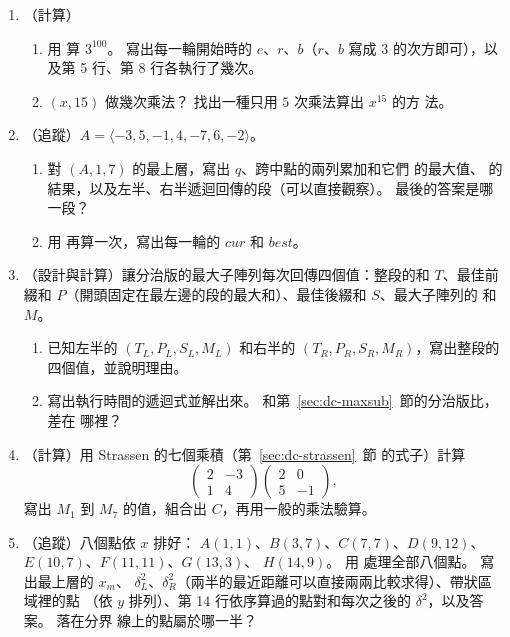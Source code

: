 \begin{enumerate}
\item \label{dc-q-pow}（計算）
\begin{enumerate}
\item 用  算 $3^{100}$。 寫出每一輪開始時的 $e$、$r$、$b$（$r$、$b$
寫成 $3$ 的次方即可），以及第 5 行、第 8 行各執行了幾次。
\item {}$(x, 15)$ 做幾次乘法？ 找出一種只用 $5$ 次乘法算出 $x^{15}$ 的方
法。
\end{enumerate}

\item \label{dc-q-maxsub}（追蹤）$A = \langle -3, 5, -1, 4, -7, 6, -2 \rangle$。
\begin{enumerate}
\item 對 $(A, 1, 7)$ 的最上層，寫出 $q$、跨中點的兩列累加和它們
的最大值、 的結果，以及左半、右半遞迴回傳的段（可以直接觀察）。
最後的答案是哪一段？
\item 用  再算一次，寫出每一輪的 $\mathit{cur}$ 和
$\mathit{best}$。
\end{enumerate}

\item \label{dc-q-four}（設計與計算）讓分治版的最大子陣列每次回傳四個值：整段的和
$T$、最佳前綴和 $P$（開頭固定在最左邊的段的最大和）、最佳後綴和 $S$、最大子陣列的
和 $M$。
\begin{enumerate}
\item 已知左半的 $(T_L, P_L, S_L, M_L)$ 和右半的 $(T_R, P_R, S_R, M_R)$，寫出整段的
四個值，並說明理由。
\item 寫出執行時間的遞迴式並解出來。 和第~\ref{sec:dc-maxsub}~節的分治版比，差在
哪裡？
\end{enumerate}

\item \label{dc-q-strassen}（計算）用 Strassen 的七個乘積（第~\ref{sec:dc-strassen}~節
的式子）計算
\[
\begin{pmatrix} 2 & -3 \\ 1 & 4 \end{pmatrix}
\begin{pmatrix} 2 & 0 \\ 5 & -1 \end{pmatrix},
\]
寫出 $M_1$ 到 $M_7$ 的值，組合出 $C$，再用一般的乘法驗算。

\item \label{dc-q-cp}（追蹤）八個點依 $x$ 排好：
$A(1, 1)$、$B(3, 7)$、$C(7, 7)$、$D(9, 12)$、$E(10, 7)$、$F(11, 11)$、$G(13, 3)$、
$H(14, 9)$。 用  處理全部八個點。 寫出最上層的 $x_m$、
$\delta_L^2$、$\delta_R^2$（兩半的最近距離可以直接兩兩比較求得）、帶狀區域裡的點
（依 $y$ 排列）、第 14 行依序算過的點對和每次之後的 $\delta^2$，以及答案。 落在分界
線上的點屬於哪一半？


\end{enumerate}
